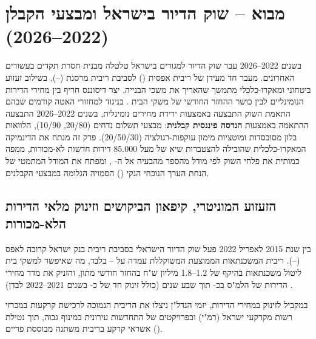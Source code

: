 
\chapter{מבוא  – שוק הדיור בישראל ומבצעי הקבלן (\num{2022}--\num{2026})}
\label{ch:israel_housing}

בשנים \num{2022}--\num{2026} עבר שוק הדיור למגורים בישראל טלטלה מבנית חסרת תקדים בעשורים האחרונים. מעבר חד מעידן של ריבית אפסית () לסביבת ריבית מרסנת (--), בשילוב זעזוע ביטחוני ומאקרו-כלכלי מתמשך שהאריך את משכי הבנייה, יצר דיסוננס חריף בין מחירי הדירות הנומינליים לבין כושר ההחזר החודשי של משקי הבית \cite{boi2024annual,boi2025stability}. בניגוד למחזורי האטה קודמים שבהם התאמת השוק התבצעה באמצעות ירידת מחירים נומינלית, בשנים \num{2022}--\num{2026} התבצעה ההתאמה באמצעות \textbf{הנדסה פיננסית קבלנית}: מבצעי תשלום נדחים (\num{20/80}, \num{10/90}), הלוואות בלון מסובסדות ומוטציות מימון עוקפות-רגולציה (\num{20/50/30}). פרק זה מנתח את הדינמיקה המאקרו-כלכלית שהובילה להצטברות שיא של מעל \num{85,000} דירות חדשות לא-מכורות, ממפה כמותית את פלחי השוק לפי מודל  מהספר מהבעיה אל ה- \cite{segal2026prep}, ומפתח את המודל המתמטי של הנחת הערך הנוכחי הנקי () הסמויה הגלומה במבצעי הקבלנים.

\section{הזעזוע המוניטרי, קיפאון הביקושים וזינוק מלאי הדירות הלא-מכורות}
\label{sec:israel_macro_inventory}

בין שנת \num{2015} לאפריל \num{2022} פעל שוק הדיור הישראלי בסביבת ריבית בנק ישראל קרובה לאפס (--). ריבית המשכנתאות הממוצעת המשוקללת עמדה על -- בלבד, מה שאיפשר למשקי בית ליטול משכנתאות בהיקף של \num{1.2}--\num{1.8} מיליון ש"ח בהחזר חודשי מתון, והזניק את מדד מחירי הדירות של הלמ"ס בכ- תוך שבע שנים (כולל זינוק חד של כ- בשנים \num{2021}--\num{2022} לבדן) \cite{boi2024annual,cbs2026dwellings}.

במקביל לזינוק במחירי הדירות, יזמי הנדל"ן ניצלו את הריבית הנמוכה לרכישת קרקעות במכרזי רשות מקרקעי ישראל (רמ"י) ובפרויקטים של התחדשות עירונית במינוף גבוה, תוך נטילת אשראי קרקע בריבית משתנה מבוססת פריים ().

